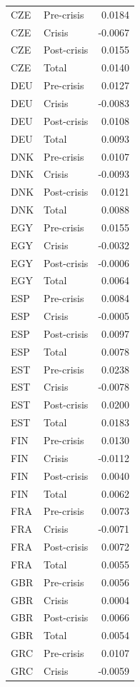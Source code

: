 \begin{longtable}[t]{llr}
CZE & Pre-crisis & 0.0184\\
CZE & Crisis & -0.0067\\
CZE & Post-crisis & 0.0155\\
\addlinespace
CZE & Total & 0.0140\\
DEU & Pre-crisis & 0.0127\\
DEU & Crisis & -0.0083\\
DEU & Post-crisis & 0.0108\\
DEU & Total & 0.0093\\
\addlinespace
DNK & Pre-crisis & 0.0107\\
DNK & Crisis & -0.0093\\
DNK & Post-crisis & 0.0121\\
DNK & Total & 0.0088\\
EGY & Pre-crisis & 0.0155\\
\addlinespace
EGY & Crisis & -0.0032\\
EGY & Post-crisis & -0.0006\\
EGY & Total & 0.0064\\
ESP & Pre-crisis & 0.0084\\
ESP & Crisis & -0.0005\\
\addlinespace
ESP & Post-crisis & 0.0097\\
ESP & Total & 0.0078\\
EST & Pre-crisis & 0.0238\\
EST & Crisis & -0.0078\\
EST & Post-crisis & 0.0200\\
\addlinespace
EST & Total & 0.0183\\
FIN & Pre-crisis & 0.0130\\
FIN & Crisis & -0.0112\\
FIN & Post-crisis & 0.0040\\
FIN & Total & 0.0062\\
\addlinespace
FRA & Pre-crisis & 0.0073\\
FRA & Crisis & -0.0071\\
FRA & Post-crisis & 0.0072\\
FRA & Total & 0.0055\\
GBR & Pre-crisis & 0.0056\\
\addlinespace
GBR & Crisis & 0.0004\\
GBR & Post-crisis & 0.0066\\
GBR & Total & 0.0054\\
GRC & Pre-crisis & 0.0107\\
GRC & Crisis & -0.0059\\

\end{longtable}
